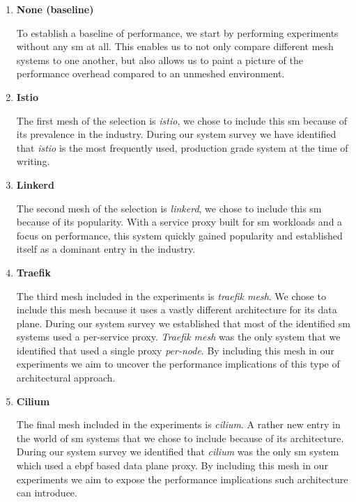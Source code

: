 \begin{enumerate}[label=\textbf{SM\arabic*}, leftmargin=3\parindent]
    \item \textbf{None (baseline)}
    \label{exp:sm:0}
    
    To establish a baseline of performance, we start by performing experiments without any \gls{sm} at all. This enables us to not only compare different mesh systems to one another, but also allows us to paint a picture of the performance overhead compared to an unmeshed environment.
    
    \item \textbf{Istio}
    \label{exp:sm:1}
   
    The first mesh of the selection is \textit{istio}, we chose to include this \gls{sm} because of its prevalence in the industry. During our system survey we have identified that \textit{istio} is the most frequently used, production grade system at the time of writing.
    
    \item \textbf{Linkerd}
    \label{exp:sm:2}
   
    The second mesh of the selection is \textit{linkerd}, we chose to include this \gls{sm} because of its popularity. With a service proxy built for \gls{sm} workloads and a focus on performance, this system quickly gained popularity and established itself as a dominant entry in the industry.

    \item \textbf{Traefik}
    \label{exp:sm:3}
    
    The third mesh included in the experiments is \textit{traefik mesh}. We chose to include this mesh because it uses a vastly different architecture for its data plane. During our system survey we established that most of the identified \gls{sm} systems used a per-service proxy. \textit{Traefik mesh} was the only system that we identified that used a single proxy \textit{per-node}. By including this mesh in our experiments we aim to uncover the performance implications of this type of architectural approach.
    
    \item \textbf{Cilium}
    \label{exp:sm:4}
    
    The final mesh included in the experiments is \textit{cilium}. A rather new entry in the world of \gls{sm} systems that we chose to include because of its architecture. During our system survey we identified that \textit{cilium} was the only \gls{sm} system which used a \gls{ebpf} based data plane proxy. By including this mesh in our experiments we aim to expose the performance implications such architecture can introduce.

\end{enumerate}


